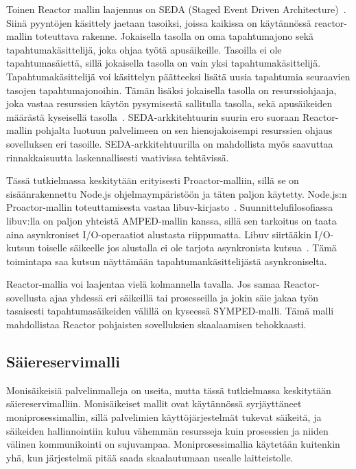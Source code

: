 \documentclass[finnish]{tktltiki2}
\theoremstyle{definition}
\theoremstyle{remark}
\begin{document}
Toinen Reactor mallin laajennus on SEDA (Staged Event Driven Architecture)~\cite{welsh_seda_2001}.
Siinä pyyntöjen käsittely jaetaan tasoiksi, joissa kaikissa on
käytännössä reactor-mallin toteuttava rakenne. Jokaisella tasolla
on oma tapahtumajono sekä tapahtumakäsittelijä, joka ohjaa työtä
apusäikeille. Tasoilla ei ole tapahtumasäiettä, sillä
jokaisella tasolla on vain yksi tapahtumakäsittelijä.
Tapahtumakäsittelijä voi käsittelyn päätteeksi
lisätä uusia tapahtumia seuraavien tasojen tapahtumajonoihin.
Tämän lisäksi jokaisella tasolla on resurssiohjaaja,
joka vastaa resurssien käytön pysymisestä sallitulla tasolla,
sekä apusäikeiden määrästä kyseisellä tasolla~\cite{welsh_seda_2001}.
SEDA-arkkitehtuurin suurin ero suoraan Reactor-mallin pohjalta luotuun
palvelimeen on sen hienojakoisempi resurssien ohjaus sovelluksen eri tasoille.
SEDA-arkkitehtuurilla on mahdollista myös saavuttaa rinnakkaisuutta
laskennallisesti vaativissa tehtävissä.

Tässä tutkielmassa keskitytään erityisesti
Proactor-malliin, sillä se on sisäänrakennettu Node.js ohjelmaympäristöön ja
täten paljon käytetty. Node.js:n Proactor-mallin toteuttamisesta vastaa
libuv-kirjasto~\cite{libuv_design_2019}. Suunnittelufilosofiassa
libuv:lla on paljon yhteistä AMPED-mallin kanssa, sillä
sen tarkoitus on taata aina asynkroniset I/O-operaatiot alustasta
riippumatta. Libuv siirtääkin I/O-kutsun toiselle säikeelle
jos alustalla ei ole tarjota asynkronista kutsua~\cite{libuv_design_2019}.
Tämä toimintapa saa kutsun näyttämään tapahtumankäsittelijästä
asynkroniselta.

Reactor-mallia voi laajentaa vielä kolmannella tavalla.
Jos samaa Reactor-sovellusta ajaa yhdessä eri säikeillä tai prosesseilla
ja jokin säie jakaa työn tasaisesti tapahtumasäikeiden välillä
on kyseessä SYMPED-malli. Tämä malli mahdollistaa
Reactor pohjaisten sovelluksien skaalaamisen tehokkaasti.

\subsection{Säiereservimalli}
Monisäikeisiä palvelinmalleja on useita, mutta tässä tutkielmassa keskitytään säiereservimalliin.
Monisäikeiset mallit ovat käytännössä syrjäyttäneet moniprosessimallin,
sillä palvelimien käyttöjärjestelmät tukevat säikeitä, ja säikeiden hallinnointiin
kuluu vähemmän resursseja kuin prosessien ja niiden välinen kommunikointi on sujuvampaa.
Moniprosessimallia käytetään kuitenkin yhä, kun järjestelmä pitää
saada skaalautumaan usealle laitteistolle.
\end{document}
